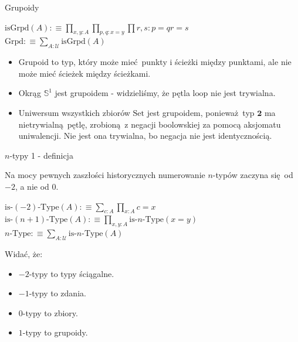 \documentclass{beamer}
\newcommand{\defn}{:\equiv}
\newcommand{\U}{\mathcal{U}}
\newcommand{\isGrpd}{\text{isGrpd}}
\newcommand{\Set}{\text{Set}}
\newcommand{\Grpd}{\text{Grpd}}
\newcommand{\hS}{\mathbb{S}^1}
\newcommand{\looop}{\text{loop}}
\begin{document}
\begin{frame}{Grupoidy}

\begin{definition}
$\isGrpd(A) \defn \prod_{x, y : A} \prod_{p, q : x = y} \prod{r, s : p = q} r = s$ \\
$\Grpd \defn \sum_{A : \U} \isGrpd(A)$
\end{definition}

\begin{itemize}
	\item Grupoid to typ, który może mieć punkty i ścieżki między punktami, ale nie może mieć ścieżek między ścieżkami.
	\item Okrąg $\hS$ jest grupoidem - widzieliśmy, że pętla $\looop$ nie jest trywialna.
	\item Uniwersum wszystkich zbiorów $\Set$ jest grupoidem, ponieważ typ $\mathbf{2}$ ma nietrywialną pętlę, zrobioną z negacji boolowskiej za pomocą aksjomatu uniwalencji. Nie jest ona trywialna, bo negacja nie jest identycznością.
\end{itemize}

\end{frame}

\begin{frame}{$n$-typy 1 - definicja}

Na mocy pewnych zaszłości historycznych numerowanie $n$-typów zaczyna się od $-2$, a nie od $0$.

\begin{definition}[$n$-typ]
$\text{is-}(-2)\text{-Type}(A) \defn \sum_{c : A} \prod_{x : A} c = x$ \\
$\text{is-}(n + 1)\text{-Type}(A) \defn \prod_{x, y : A} \text{is-}n\text{-Type}(x = y)$ \\
$n\text{-Type} \defn \sum_{A : \U} \text{is-}n\text{-Type}(A)$
\end{definition}

Widać, że:
\begin{itemize}
	\item $-2$-typy to typy ściągalne.
	\item $-1$-typy to zdania.
	\item $0$-typy to zbiory.
	\item $1$-typy to grupoidy.
\end{itemize}

\end{frame}
\end{document}
